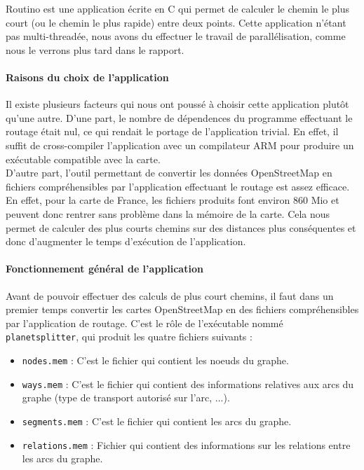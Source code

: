 Routino est une application écrite en C qui permet de calculer le chemin le 
plus court (ou le chemin le plus rapide) entre deux points. Cette application 
n'étant pas multi-threadée, nous avons du effectuer le travail de
parallélisation, comme nous le verrons plus tard dans le rapport.

\paragraph{Raisons du choix de l'application}
Il existe plusieurs facteurs qui nous ont poussé à choisir cette application 
plutôt qu'une autre. D'une part, le nombre de dépendences du programme
effectuant le routage était nul, ce qui rendait le portage de l'application
trivial. En effet, il suffit de cross-compiler l'application avec un compilateur
ARM pour produire un exécutable compatible avec la carte. \\
D'autre part, l'outil permettant de convertir les données OpenStreetMap en 
fichiers compréhensibles par l'application effectuant le routage est assez 
efficace. En effet, pour la carte de France, les fichiers produits font environ 
860 Mio et peuvent donc rentrer sans problème dans la mémoire de la carte. Cela 
nous permet de calculer des plus courts chemins sur des distances plus 
conséquentes et donc d'augmenter le temps d'exécution de l'application.

\paragraph{Fonctionnement général de l'application}
Avant de pouvoir effectuer des calculs de plus court chemins, il faut dans un 
premier temps convertir les cartes OpenStreetMap en des fichiers compréhensibles
par l'application de routage. C'est le rôle de l'exécutable nommé
\texttt{planetsplitter}, qui produit les quatre fichiers suivants :

\begin{itemize}
\renewcommand{\labelitemi}{$\bullet$}
\item \texttt{nodes.mem} : C'est le fichier qui contient les noeuds du graphe.
\item \texttt{ways.mem} : C'est le fichier qui contient des informations 
relatives aux arcs du graphe (type de transport autorisé sur l'arc, ...).
\item \texttt{segments.mem} : C'est le fichier qui contient les arcs du graphe.
\item \texttt{relations.mem} : Fichier qui contient des informations sur les 
relations entre les arcs du graphe.
\end{itemize}

